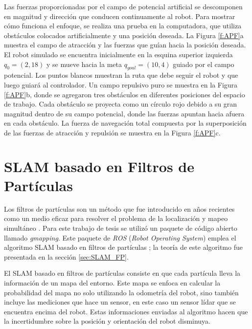 Las fuerzas proporcionadas por el campo de potencial artificial se descomponen en 
magnitud y dirección que conducen continuamente al robot. Para mostrar cómo funciona el 
enfoque, se realiza una prueba en la computadora, que utiliza obstáculos 
colocados artificialmente y una posición deseada. La Figura \ref{f:APF}a muestra el campo 
de atracción y las fuerzas que guían hacia la posición deseada. El robot simulado se 
encuentra inicialmente en la esquina superior izquierda $q_{0} = (2,18)$ y se mueve hacia 
la meta $q_{goal} = (10,4)$ guiado por el campo potencial. Los puntos blancos muestran la 
ruta que debe seguir el robot y que luego guiará al controlador. Un campo repulsivo puro 
se muestra en la Figura \ref{f:APF}b, donde se agregaron tres obstáculos en diferentes 
posiciones del espacio de trabajo. Cada obstáculo se proyecta como un círculo rojo debido 
a su gran magnitud dentro de su campo potencial, donde las fuerzas apuntan hacia afuera 
en cada obstáculo. La fuerza de navegación total compuesta por la superposición de las 
fuerzas de atracción y repulsión se muestra en la Figura \ref{f:APF}c.

\section{SLAM basado en Filtros de Part\'iculas}
\label{sec:GMAPPING}
Los filtros de partículas son un método que fue introducido en años recientes como un medio 
eficaz para resolver el problema de la localización y mapeo simultáneo 
\cite{nummiaro2003adaptive}. Para este trabajo de tesis se utilizó un paquete de código 
abierto llamado \textit{gmapping}. Este paquete de \textit{ROS} (\textit{Robot Operating System}) 
emplea el algoritmo SLAM basado en filtros de partículas \cite{grisetti2007improved}; la teoría
de este algoritmo fue presentada en la sección \ref{sec:SLAM_FP}.

El SLAM basado en filtros de partículas consiste en que cada partícula lleva la información de 
un mapa del entorno. Este mapa se enfoca en calcular la probabilidad del mapa no solo utilizando 
la odometría del robot, sino también incluye las mediciones que hace un sensor, en este caso un 
sensor lídar que se encuentra encima del robot. Estas informaciones enviadas al algoritmo hacen 
que la incertidumbre sobre la posición y orientación del robot disminuya. 

